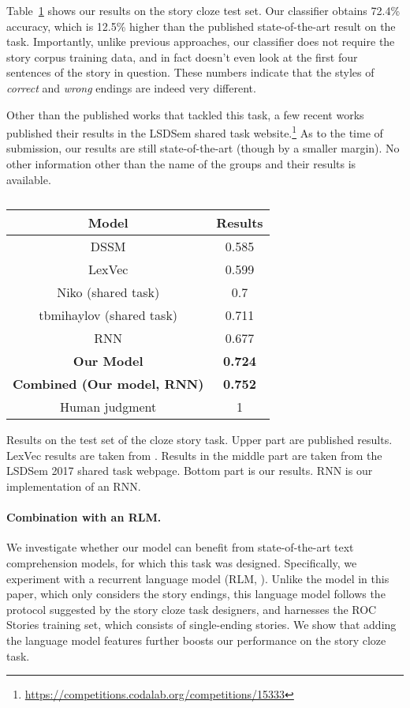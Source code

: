 \documentclass[11pt,a4paper]{article}
\newcommand{\tabref}[1]{Table~\ref{#1}}
\begin{document}
\tabref{cloze_results} shows our results on the story cloze test set. Our classifier obtains 72.4\% accuracy, which is 12.5\% higher than the published state-of-the-art result on the task.
Importantly, unlike previous approaches, our classifier does not require the story corpus training data, and in fact doesn't even look at the first four sentences of the story in question.
These numbers indicate that the styles of {\it correct} and {\it wrong} endings are indeed very different.

Other than the published works that tackled this task, a few  recent works published their results in the LSDSem shared task website.\footnote{\url{https://competitions.codalab.org/competitions/15333}} 
As to the time of submission, our results are still state-of-the-art (though by a  smaller margin). 
No other information other than the name of the groups and their results is available.

\begin{table}[!t]
\begin{center}
\begin{tabular}{|c|c|} \hline
{\bf Model} & {\bf Results} \\ \hline
{DSSM} \cite{Mostafazadeh:2016} & 0.585 \\ \hline
{ LexVec} \cite{Salle:2016} & 0.599 \\ \hline\hline
{ Niko (shared task)}	& 0.7\\ \hline
{ tbmihaylov (shared task)} & 0.711\\ \hline\hline
{RNN}		& 0.677 \\ \hline
{\bf Our Model} & {\bf 0.724} \\ \hline
{\bf Combined (Our model, RNN)} & {\bf 0.752} \\ \hline\hline
Human judgment & 1 \\ \hline
\end{tabular}
\end{center}
\caption{\label{cloze_results}}
Results on the test set of the cloze story task. 
Upper part are published results.
LexVec results are taken from \cite{Speer:2016}.
Results in the middle part are taken from the LSDSem 2017 shared task webpage.
Bottom part is our results.
RNN is our implementation of an RNN.
\end{table}


\paragraph{Combination with an RLM.}
We investigate whether our model can benefit from state-of-the-art text comprehension models, for which this task was designed. 
Specifically, we experiment with a recurrent language model (RLM, \citet{mikolov2010recurrent}). %
Unlike the model in this paper, which only considers the story endings, this language model follows the protocol suggested by the story cloze task designers, and harnesses the ROC Stories training set, which consists of single-ending stories. 
We show that adding the language model features  further boosts our performance on the story cloze task.
\end{document}
